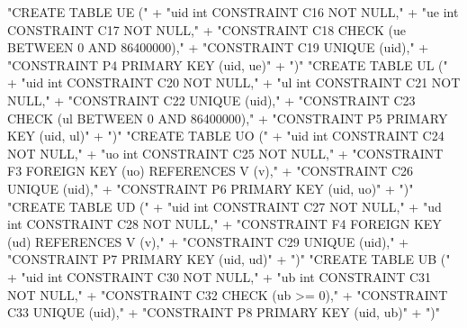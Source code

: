 "CREATE TABLE UE ("
  + "uid int  CONSTRAINT C16 NOT NULL,"
  + "ue  int  CONSTRAINT C17 NOT NULL,"
  + "CONSTRAINT C18 CHECK (ue BETWEEN 0 AND 86400000),"
  + "CONSTRAINT C19 UNIQUE (uid),"
  + "CONSTRAINT P4 PRIMARY KEY (uid, ue)"
  + ")"
\nwendcode{}\nwdocspar
\nwenddocs{}\endmoddef{}
"CREATE TABLE UL ("
  + "uid int  CONSTRAINT C20 NOT NULL,"
  + "ul  int  CONSTRAINT C21 NOT NULL,"
  + "CONSTRAINT C22 UNIQUE (uid),"
  + "CONSTRAINT C23 CHECK (ul BETWEEN 0 AND 86400000),"
  + "CONSTRAINT P5 PRIMARY KEY (uid, ul)"
  + ")"
\nwendcode{}\nwdocspar
\nwenddocs{}\endmoddef{}
"CREATE TABLE UO ("
  + "uid int  CONSTRAINT C24 NOT NULL,"
  + "uo  int  CONSTRAINT C25 NOT NULL,"
  + "CONSTRAINT F3 FOREIGN KEY (uo) REFERENCES V (v),"
  + "CONSTRAINT C26 UNIQUE (uid),"
  + "CONSTRAINT P6 PRIMARY KEY (uid, uo)"
  + ")"
\nwendcode{}\nwdocspar
\nwenddocs{}\endmoddef{}
"CREATE TABLE UD ("
  + "uid int  CONSTRAINT C27 NOT NULL,"
  + "ud  int  CONSTRAINT C28 NOT NULL,"
  + "CONSTRAINT F4 FOREIGN KEY (ud) REFERENCES V (v),"
  + "CONSTRAINT C29 UNIQUE (uid),"
  + "CONSTRAINT P7 PRIMARY KEY (uid, ud)"
  + ")"
\nwendcode{}\nwdocspar
\nwenddocs{}\endmoddef{}
"CREATE TABLE UB ("
  + "uid int  CONSTRAINT C30 NOT NULL,"
  + "ub  int  CONSTRAINT C31 NOT NULL,"
  + "CONSTRAINT C32 CHECK (ub >= 0),"
  + "CONSTRAINT C33 UNIQUE (uid),"
  + "CONSTRAINT P8 PRIMARY KEY (uid, ub)"
  + ")"
\nwendcode{}\nwdocspar

